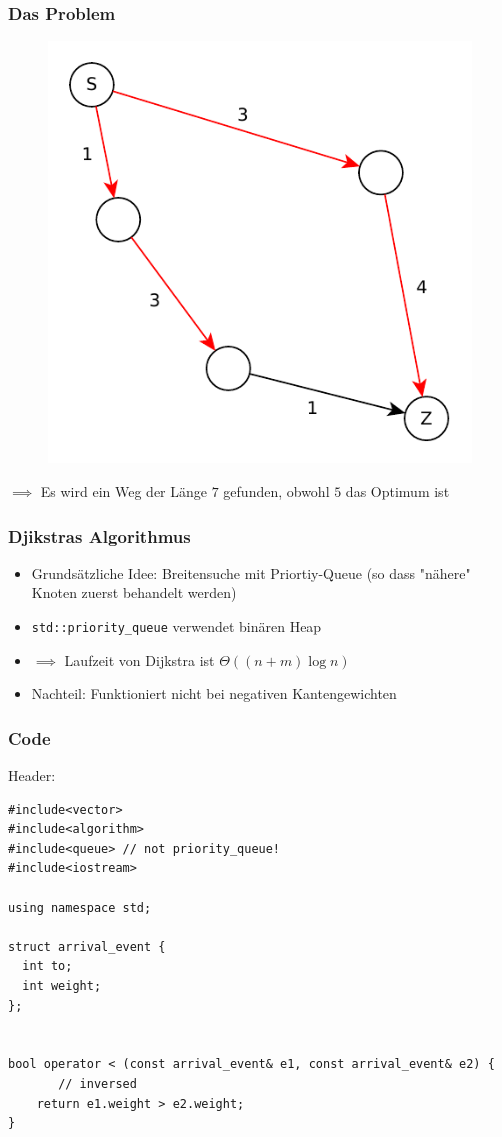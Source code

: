 \begin{frame}
\frametitle{Das Problem}
\begin{figure}
\includegraphics[scale=.8]{dijkstra_graphs/bfs_fail_4.pdf}
\end{figure}

$\implies$ Es wird ein Weg der Länge $7$ gefunden, obwohl $5$ das Optimum ist

\end{frame}


\begin{frame}
\frametitle{Djikstras Algorithmus}
\begin{itemize}
\item Grundsätzliche Idee: Breitensuche mit Priortiy-Queue (so dass "nähere" Knoten zuerst behandelt werden)
\item \lstinline|std::priority_queue| verwendet binären Heap
\item $\implies$ Laufzeit von Dijkstra ist $\Theta((n + m) \log n)$
\item Nachteil: Funktioniert nicht bei negativen Kantengewichten
\end{itemize}
\end{frame}

\begin{frame}[fragile]
\frametitle{Code}
Header: 
\begin{lstlisting}[basicstyle=\tiny]
#include<vector>
#include<algorithm>
#include<queue> // not priority_queue!
#include<iostream>

using namespace std;

struct arrival_event {
  int to;
  int weight;
};


bool operator < (const arrival_event& e1, const arrival_event& e2) {
	   // inversed
    return e1.weight > e2.weight;
}
\end{lstlisting}

\end{frame}


